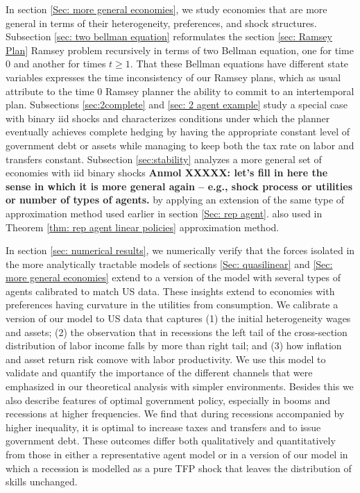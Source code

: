 \documentclass[thmsb,11pt]{article}
\begin{document}
 In section \ref{Sec: more general economies},
we study economies that are more general in terms of their  heterogeneity, preferences, and shock structures.  Subsection 
\ref{sec: two bellman equation} reformulates  the section \ref{sec: Ramsey Plan} Ramsey problem recursively in terms of two Bellman equation,
one for time $0$ and another for times $t\geq 1$.  That these Bellman equations have different state variables expresses the time inconsistency
of our Ramsey plans, which as usual attribute to the time $0$ Ramsey planner the ability to commit to an intertemporal plan.  
Subsections \ref{sec:2complete} and \ref{sec: 2 agent example}   study a special case with   binary iid shocks and characterizes conditions under which the planner eventually
achieves complete hedging by having the appropriate constant level of government debt or assets while managing to keep both the tax rate on labor
 and transfers constant.  %
Subsection \ref{sec:stability} analyzes  a more general set of economies  with iid binary shocks \textbf{Anmol XXXXX: let's fill in here the sense in which
it is more general again -- e.g., shock process or utilities or number of types of agents.} 
by applying an  extension of  the same type of approximation method used earlier in section \ref{Sec: rep agent}.
 also used in Theorem \ref{thm: rep agent linear policies}  approximation method.



\color{black}
In section \ref{sec: numerical results},
we numerically verify that the forces isolated in the more analytically tractable  models of sections \ref{Sec: quasilinear}
  and \ref{Sec: more general economies} extend to a version of the model with several types of agents  calibrated to match US data.
These insights extend to economies with preferences having curvature in the utilities from consumption. We calibrate a version of our model to US data that captures (1) the initial heterogeneity wages and assets;
(2) the observation  that  in recessions the left tail of the cross-section distribution of labor income falls by more than right tail; and (3) how inflation and asset return risk comove with labor productivity. We use this model to validate and quantify the importance of the different channels that were emphasized in our theoretical analysis with simpler environments. Besides this we also describe features of optimal government policy, especially in booms and recessions at higher frequencies. We find that during recessions accompanied by higher inequality, it is  optimal to increase taxes and transfers and to issue
government debt. %
These outcomes differ both qualitatively and quantitatively from those in either a representative agent model or in a version
of our model in which a  recession is modelled as a pure TFP shock that leaves the distribution of skills unchanged.
\end{document}
